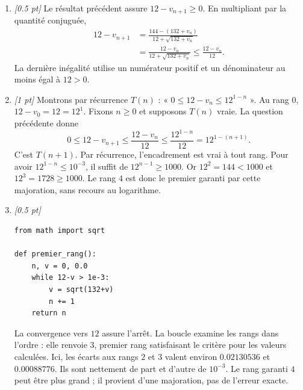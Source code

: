 \begin{enumerate}
\item \textit{[\num{0,5} pt]} Le résultat précédent assure $12-v_{n+1}\ge0$. En multipliant par la quantité conjuguée,
\[\begin{aligned}12-v_{n+1}&=\frac{144-(132+v_n)}{12+\sqrt{132+v_n}}\\&=\frac{12-v_n}{12+\sqrt{132+v_n}}\le\frac{12-v_n}{12}.\end{aligned}\]
La dernière inégalité utilise un numérateur positif et un dénominateur au moins égal à $12>0$.

\item \textit{[1 pt]} Montrons par récurrence $T(n)$ : « $0\le 12-v_n\le 12^{1-n}$ ».
Au rang $0$, $12-v_0=12=12^1$. Fixons $n\ge0$ et supposons $T(n)$ vraie. La question précédente donne
\[0\le 12-v_{n+1}\le\frac{12-v_n}{12}\le\frac{12^{1-n}}{12}=12^{1-(n+1)}.\]
C'est $T(n+1)$. Par récurrence, l'encadrement est vrai à tout rang.
Pour avoir $12^{1-n}\le10^{-3}$, il suffit de $12^{n-1}\ge1000$.
Or $12^{2}=144<1000$ et $12^{3}=1728\ge1000$. Le rang $4$ est donc le premier garanti par cette majoration, sans recours au logarithme.


\item \textit{[\num{0,5} pt]} 
\begin{lstlisting}
from math import sqrt

def premier_rang():
    n, v = 0, 0.0
    while 12-v > 1e-3:
        v = sqrt(132+v)
        n += 1
    return n
\end{lstlisting}
La convergence vers $12$ assure l'arrêt. La boucle examine les rangs dans l'ordre : elle renvoie $3$, premier rang satisfaisant le critère pour les valeurs calculées. Ici, les écarts aux rangs $2$ et $3$ valent environ $\num{0,02130536}$ et $\num{0,00088776}$. Ils sont nettement de part et d'autre de $10^{-3}$. Le rang garanti $4$ peut être plus grand ; il provient d'une majoration, pas de l'erreur exacte.

\end{enumerate}

